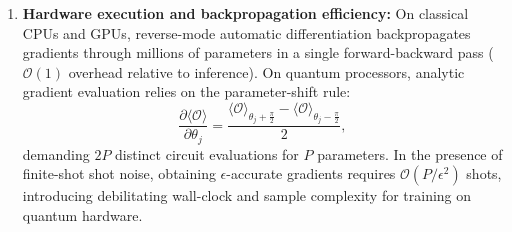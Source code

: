 \begin{enumerate}[leftmargin=*]
  \item \textbf{Hardware execution and backpropagation efficiency:} On classical CPUs and GPUs, reverse-mode automatic differentiation backpropagates gradients through millions of parameters in a single forward-backward pass ($\mathcal{O}(1)$ overhead relative to inference). On quantum processors, analytic gradient evaluation relies on the parameter-shift rule:
  \begin{equation}
    \frac{\partial \langle \mathcal{O} \rangle}{\partial \theta_j} = \frac{\langle \mathcal{O} \rangle_{\theta_j + \frac{\pi}{2}} - \langle \mathcal{O} \rangle_{\theta_j - \frac{\pi}{2}}}{2},
  \end{equation}
  demanding $2P$ distinct circuit evaluations for $P$ parameters. In the presence of finite-shot shot noise, obtaining $\epsilon$-accurate gradients requires $\mathcal{O}(P / \epsilon^2)$ shots, introducing debilitating wall-clock and sample complexity for training on quantum hardware.
\end{enumerate}

